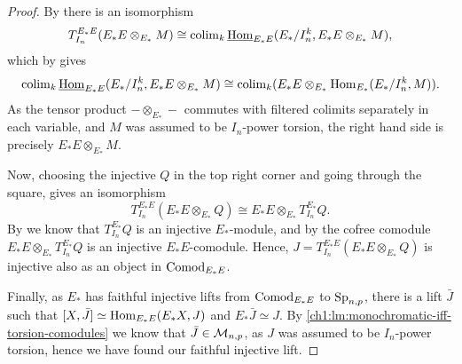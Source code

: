 \begin{proof}
    By \cite[5.5]{barthel-heard-valenzuela_2018} there is an isomorphism
    \[T^{E_*E}_{I_n} (E_*E\otimes_{E_*}M) \cong \operatorname{colim}_k \operatorname{\underline{Hom}}_{E_*E}(E_*/I_n^k, E_*E\otimes_{E_*}M),\]
    which by \cite[4.4]{barthel-heard-valenzuela_2018} gives
    \[\operatorname{colim}_k \operatorname{\underline{Hom}}_{E_*E}(E_*/I_n^k, E_*E\otimes_{E_*}M) \cong \operatorname{colim}_k (E_*E \otimes_{E_*} \operatorname{Hom}_{E_*}(E_*/I_n^k, M)).\]
    As the tensor product $-\otimes_{E_*}-$ commutes with filtered colimits separately in each variable, and $M$ was assumed to be $I_n$-power torsion, the right hand side is precisely $E_*E\otimes_{E_*}M$.    
    
    Now, choosing the injective $Q$ in the top right corner and going through the square, gives an isomorphism 
    \[T^{E_*E}_{I_n}(E_*E\otimes_{E_*}Q)\cong E_*E\otimes_{E_*}T_{I_n}^{E_*}Q.\] 
    By \cite[2.1.4]{brodmann-sharp_1998} we know that $T^{E_*}_{I_n}Q$ is an injective $E_*$-module, and by \cite[2.1(a)]{hovey-strickland_2005b} the cofree comodule $E_*E\otimes_{E_*} T^{E_*}_{I_n}Q$ is an injective $E_*E$-comodule. Hence, $J=T^{E_*E}_{I_n}(E_*E\otimes_{E_*}Q)$ is injective also as an object in $\mathrm{Comod}_{E_*E}$.

    Finally, as $E_*$ has faithful injective lifts from $\mathrm{Comod}_{E_*E}$ to $\mathrm{Sp}_{n,p}$, there is a lift $\bar{J}$ such that $[X,\bar{J}]\simeq \operatorname{Hom}_{E_*E}(E_*X, J)$ and $E_*\bar{J}\simeq J$. By \cref{ch1:lm:monochromatic-iff-torsion-comodules} we know that $\bar{J}\in \mathcal{M}_{n,p}$, as $J$ was assumed to be $I_n$-power torsion, hence we have found our faithful injective lift. 
\end{proof}

